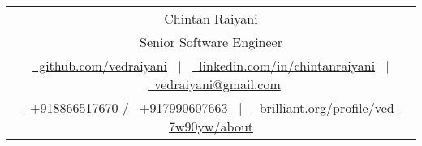 \documentclass[a4paper,12pt]{article}
\begin{document}
\pagestyle{empty}



\begin{tabularx}{\linewidth}{@{} C @{}}
	\Huge{Chintan Raiyani}                                                                                                          \\
	\large{Senior Software Engineer}                                                                                                \\[7.5pt]
	\href{https://github.com/vedraiyani}{\raisebox{-0.05\height}\faGithub\ github.com/vedraiyani} \ $|$ \                           
	\href{https://linkedin.com/in/chintanraiyani}{\raisebox{-0.05\height}\faLinkedin\ linkedin.com/in/chintanraiyani} \ $|$ \       
	\href{mailto:vedraiyani@gmail.com}{\raisebox{-0.05\height}\faEnvelope \ vedraiyani@gmail.com}                                   \\%
	\href{tel:+918866517670}{\raisebox{-0.05\height}\faMobile \ +918866517670} /\href{tel:+917990607663}{\raisebox{-0.05\height} \ +917990607663} \ $|$ \                                              
	\href{https://brilliant.org/profile/ved-7w90yw/about}{\raisebox{-0.05\height}\faGlobe \ brilliant.org/profile/ved-7w90yw/about} \\
\end{tabularx}


\end{document}
